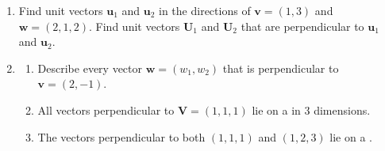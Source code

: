\documentclass[14pt, a4paper]{article}
\begin{document}
\begin{enumerate}
    \item Find unit vectors $\boldsymbol{u}_1$ and $\boldsymbol{u}_2$ in the directions of $\boldsymbol{v} = (1,3)$ and $\boldsymbol{w} = (2,1,2)$. Find unit vectors $\boldsymbol{U}_1$ and $\boldsymbol{U}_2$ that are perpendicular to $\boldsymbol{u}_1$ and $\boldsymbol{u}_2$.

    \item
          \begin{enumerate}
              \item Describe every vector $\boldsymbol{w} = (w_1, w_2)$ that is perpendicular to $\boldsymbol{v} = (2, -1)$.
              \item All vectors perpendicular to $\boldsymbol{V} = (1,1,1)$ lie on a \underline{\hspace{2cm}} in 3 dimensions.
              \item The vectors perpendicular to both $(1,1,1)$ and $(1,2,3)$ lie on a \underline{\hspace{2cm}}.
          \end{enumerate}


\end{enumerate}
\end{document}
